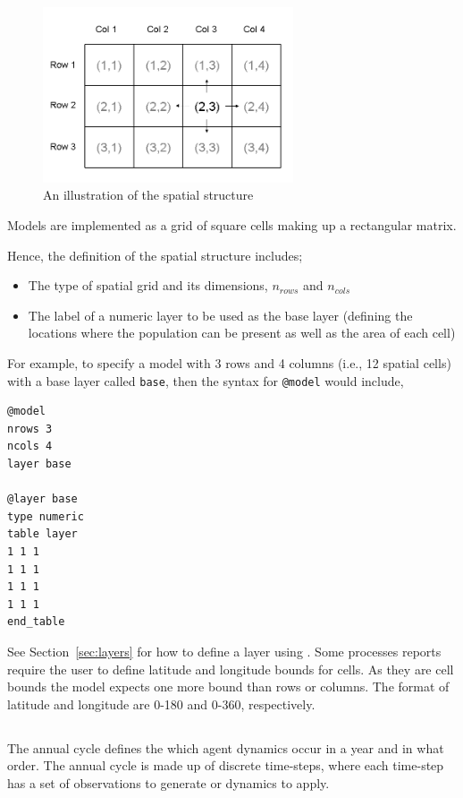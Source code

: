 \begin{figure}[htp]
	\centering
	\includegraphics[width=0.66\textwidth]{Figures/SquareStructure}
	\caption{An illustration of the spatial structure}
	\label{fig:SquareSpatialStructure}
\end{figure}

Models are implemented as a grid of square cells making up a rectangular matrix.

Hence, the definition of the spatial structure includes;
\begin{itemize}
	\item The type of spatial grid and its dimensions, $n_{rows}$ and $n_{cols}$
	\item The label of a numeric layer to be used as the base layer (defining the locations where the population can be present as well as the area of each cell)
\end{itemize}

For example, to specify a model with 3 rows and 4 columns (i.e., 12 spatial cells) with a base layer called \texttt{base}, then the syntax for \texttt{@model} would include,

{\small{\begin{verbatim}
@model
nrows 3
ncols 4
layer base
		
@layer base
type numeric
table layer
1 1 1 
1 1 1
1 1 1
1 1 1 
end_table		
\end{verbatim}}}

See Section~\ref{sec:layers} for how to define a layer using . Some processes reports require the user to define latitude and longitude bounds for cells. As they are cell bounds the model expects one more bound than rows or columns. The format of latitude and longitude are 0-180 and 0-360, respectively.


\subsection{}\label{sub:sec:annualcylc}
The annual cycle defines the which agent dynamics occur in a year and in what order. The annual cycle is made up of discrete time-steps, where each time-step has a set of observations to generate or dynamics to apply. 

